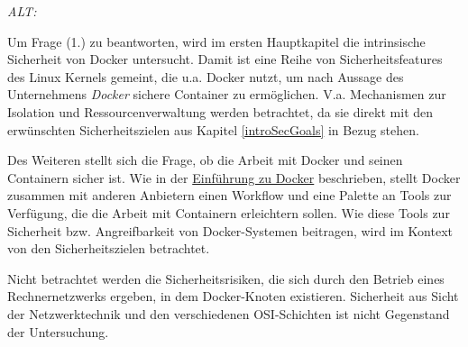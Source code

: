 \documentclass[../main.tex]{subfiles}
\begin{document}


  \emph{ALT:}


  Um Frage (1.) zu beantworten, wird im ersten Hauptkapitel die intrinsische Sicherheit von Docker untersucht. Damit ist eine Reihe von Sicherheitsfeatures des Linux Kernels gemeint, die u.a. Docker nutzt, um nach Aussage des Unternehmens \emph{Docker} sichere Container zu ermöglichen. V.a. Mechanismen zur Isolation und Ressourcenverwaltung werden betrachtet, da sie direkt mit den erwünschten Sicherheitszielen aus Kapitel \ref{introSecGoals} in Bezug stehen.

  Des Weiteren stellt sich die Frage, ob die Arbeit mit Docker und seinen Containern sicher ist. Wie in der \hyperref[dockerIntro]{Einführung zu Docker} beschrieben, stellt Docker zusammen mit anderen Anbietern einen Workflow und eine Palette an Tools zur Verfügung, die die Arbeit mit Containern erleichtern sollen. Wie diese Tools zur Sicherheit bzw. Angreifbarkeit von Docker-Systemen beitragen, wird im Kontext von den Sicherheitszielen betrachtet.

  Nicht betrachtet werden die Sicherheitsrisiken, die sich durch den Betrieb eines Rechnernetzwerks ergeben, in dem Docker-Knoten existieren. Sicherheit aus Sicht der Netzwerktechnik und den verschiedenen \acrshort{OSI}-Schichten ist nicht Gegenstand der Untersuchung.


\end{document}
